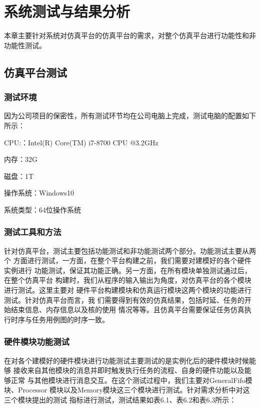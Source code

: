 
\chapter{系统测试与结果分析}

本章主要针对系统对仿真平台的仿真平台的需求，对整个仿真平台进行功能性和非功能性测试。
\section{仿真平台测试}

\subsection{测试环境}

因为公司项目的保密性，所有测试环节均在公司电脑上完成，测试电脑的配置如下所示：

CPU:：Intel(R) Core(TM) i7-8700 CPU @3.2GHz

内存：32G

磁盘：1T

操作系统：Windows10

系统类型：64位操作系统

\subsection{测试工具和方法}

针对仿真平台，测试主要包括功能测试和非功能测试两个部分。功能测试主要从两个
方面进行测试，一方面，在整个平台构建之前，我们需要对建模好的各个硬件实例进行
功能测试，保证其功能正确。另一方面，在所有模块单独测试通过后，在整个仿真平台
构建时，我们从程序的输入输出为角度，对仿真平台的各个模块进行测试。这里主要对
硬件平台构建模块和仿真运行模块这两个模块的功能进行测试。针对仿真平台而言，我
们需要得到有效的仿真结果，包括时延、任务的开始结束信息、内存信息以及核的使用
情况等等。且仿真平台需要保证任务仿真执行时序与任务用例图的时序一致。

\subsection{硬件模块功能测试}
在对各个建模好的硬件模块进行功能测试主要测试的是实例化后的硬件模块时候能够
接收来自其他模块的消息并即时触发执行任务的流程、自身的硬件功能以及能够正常
与其他模块进行消息交互。在这个测试过程中，我们主要对GeneralFifo模块、Processor
模块以及Memory模块这三个模块进行测试。针对需求分析中对这三个模块提出的测试
指标进行测试，测试结果如表6.1、表6.2和表6.3所示：

